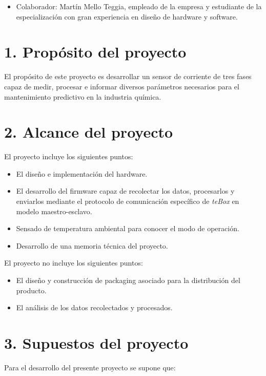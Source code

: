 \documentclass[11pt]{charter}
\begin{document}
\begin{itemize}
\item Colaborador: Martín Mello Teggia, empleado de la empresa \empclientename  y estudiante de la especialización con gran experiencia en diseño de hardware y software.
\end{itemize}




\section{1. Propósito del proyecto}
\label{sec:proposito}

El propósito de este proyecto es desarrollar un sensor de corriente de tres fases capaz de medir, procesar e informar diversos parámetros necesarios para el mantenimiento predictivo en la industria química.

\section{2. Alcance del proyecto}
\label{sec:alcance}

El proyecto incluye los siguientes puntos:
\begin{itemize}
\item El diseño e implementación del hardware.
\item El desarrollo del firmware capaz de recolectar los datos, procesarlos y enviarlos mediante el protocolo de comunicación específico de \textit{teBox} en modelo maestro-esclavo.
\item Sensado de temperatura ambiental para conocer el modo de operación.
\item Desarrollo de una memoria técnica del proyecto.
\end{itemize}

El proyecto no incluye los siguientes puntos:
\begin{itemize}
\item El diseño y construcción de packaging asociado para la distribución del producto.
\item El análisis de los datos recolectados y procesados.
\end{itemize}

\section{3. Supuestos del proyecto}
\label{sec:supuestos}

Para el desarrollo del presente proyecto se supone que:
\end{document}
